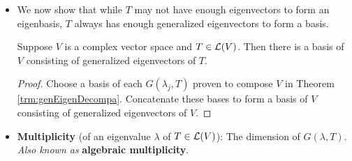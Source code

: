 \documentclass[../main.tex]{subfiles}
\begin{document}
\begin{itemize}
\begin{theorem}
\begin{enumerate}[label={\textup{(}\alph*\textup{)}},ref={\thetheorem\alph*}]
\begin{proof}
            \end{proof}
            \item \label{trm:genEigenDecompb}Each $G(\lambda_j,T)$ is invariant under $T$.
            \begin{proof}
                By Theorem \ref{trm:generalizedEigenspaces}, $G(\lambda_j,T)=\nul(T-\lambda_jI)^{\dim V}$. By Theorem \ref{trm:polTinvariant}, if $p(z)=(z-\lambda_j)^{\dim V}$, then $\nul p(T)=\nul(T-\lambda_jI)^{\dim V}$ is invariant under $T$. Therefore, $G(\lambda_j,T)$ is invariant under $T$, as desired.
            \end{proof}
            \item \label{trm:genEigenDecompc}Each $(T-\lambda_jI)|_{G(\lambda_j,T)}$ is nilpotent.
            \begin{proof}
                Let $v\in G(\lambda_j,T)$. Then
                \begin{align*}
                    ((T-\lambda_jI)|_{G(\lambda_j,T)})^{\dim V}v &= (T-\lambda_jI)^{\dim V}v\\
                    &= 0\tag*{Theorem \ref{trm:generalizedEigenspaces}}
                \end{align*}
                Thus, since there is a positive integer power of $(T-\lambda_jI)|_{G(\lambda_j,T)}$ such that $(T-\lambda_jI)|_{G(\lambda_j,T)}=0$, $(T-\lambda_jI)|_{G(\lambda_j,T)}$ is nilpotent, as desired.
            \end{proof}
        \end{enumerate}
    \end{theorem}
    \item We now show that while $T$ may not have enough eigenvectors to form an eigenbasis, $T$ always has enough generalized eigenvectors to form a basis.
    \begin{theorem}
        Suppose $V$ is a complex vector space and $T\in\mathcal{L}(V)$. Then there is a basis of $V$ consisting of generalized eigenvectors of $T$.
        \begin{proof}
            Choose a basis of each $G(\lambda_j,T)$ proven to compose $V$ in Theorem \ref{trm:genEigenDecompa}. Concatenate these bases to form a basis of $V$ consisting of generalized eigenvectors of $V$.
        \end{proof}
    \end{theorem}
    \item \textbf{Multiplicity} (of an eigenvalue $\lambda$ of $T\in\mathcal{L}(V)$): The dimension of $G(\lambda,T)$. \emph{Also known as} \textbf{algebraic multiplicity}.

\end{itemize}
\end{document}
